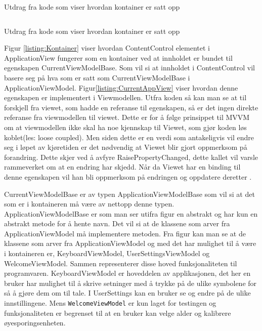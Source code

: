 {\begin{listing}[ht] 
\inputminted[fontsize=\footnotesize, frame=lines,framesep=2mm,baselinestretch=1.2,bgcolor=lightgray,linenos]{xml}{Code/ApplicationContainer.xml} 
\caption{Utdrag fra kode som viser hvordan kontainer er satt opp} 
\label{listing:Kontainer} 
\end{listing} 
 
 
\begin{listing}[ht] 
\inputminted[fontsize=\footnotesize, frame=lines,framesep=2mm,baselinestretch=1.2,bgcolor=lightgray,linenos]{csharp}{Code/CurrentApplicationView.cs} 
\caption{Utdrag fra kode som viser hvordan kontainer er satt opp} 
\label{listing:CurrentAppView} 
\end{listing} 
 
 
 
Figur \ref{listing:Kontainer} viser hvordan ContentControl elementet i ApplicationView fungerer som en kontainer ved at innholdet er bundet til egenskapen CurrentViewModelBase. Som vil si at innholdet i ContentControl vil basere seg på hva som er satt som CurrentViewModelBase i ApplicationViewModel. Figur\ref{listing:CurrentAppView} viser hvordan denne egenskapen er implementert i Viewmodellen. Utfra koden så kan man se at til forskjell fra viewet, som hadde en referanse til egenskapen, så er det ingen direkte referanse fra viewmodellen til viewet. Dette er for å følge prinsippet til MVVM om at viewmodellen ikke skal ha noe kjennskap til Viewet, som gjør koden løs koblet(les: loose coupled). Men siden dette er en verdi som antakeligvis vil endre seg i løpet av kjøretiden er det nødvendig at Viewet blir gjort oppmerksom på forandring. Dette skjer ved å avfyre RaisePropertyChanged, dette kallet vil varsle rammeverket om at en endring har skjedd. Når da Viewet har en binding til denne egenskapen vil han bli oppmerksom på endringen og oppdatere deretter \cite{MVVM4:online}. 
 
CurrentViewModelBase er av typen ApplicationViewModelBase som vil si at det som er i kontaineren må være av nettopp denne typen. ApplicationViewModelBase er som man ser utifra figur  en abstrakt og har kun en abstrakt metode for å hente navn.  Det vil si at de klassene som arver fra ApplicationViewModel må implementere metoden. Fra figur kan man se at de klassene som arver fra ApplicationViewModel og med det har mulighet til å være i kontaineren er, KeyboardViewModel, UserSettingsViewModel og WelcomeViewModel. Sammen representerer disse hoved funksjonaliteten til programvaren. KeyboardViewModel er hoveddelen av applikasjonen, det her en bruker har mulighet til å skrive setninger med å trykke på de ulike symbolene for så å gjøre dem om til tale. I UserSettings kan en bruker se og endre på de ulike innstillingene. Mens \texttt{WelcomeViewModel} er kun laget for testingen og funksjonaliteten er begrenset til at en bruker kan velge alder og kalibrere øyesporingsenheten. 
 
}
